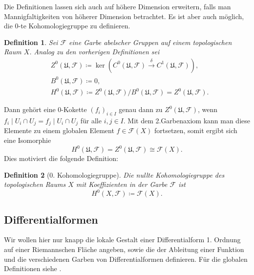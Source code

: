 \documentclass[11pt,a4paper,toc=bibliography]{scrartcl}
\theoremstyle{def}
\newtheorem{defi}{Definition}[section]
\theoremstyle{thm}
\theoremstyle{remark}
\newcommand*\dif{\mathop{}\!\mathrm{d}}\newcommand{\einschraenkung}{\,\rule[-5pt]{0.4pt}{12pt}\,{}} %
\begin{document}
Die Definitionen lassen sich auch auf höhere Dimension erweitern, falls man Mannigfaltigkeiten von höherer Dimension betrachtet. Es ist aber auch möglich, die 0-te Kohomologiegruppe zu definieren.


\begin{defi}
	Sei $\mathcal{F}$ eine Garbe abelscher Gruppen auf einem topologischen Raum $X$. Analog zu den vorherigen Definitionen sei
	\begin{align*}
		&Z^0(\mathfrak{U},\mathcal{F})\coloneqq \ker\left( C^0(\mathfrak{U},\mathcal{F}) \overset{\delta}{\rightarrow} C^1(\mathfrak{U},\mathcal{F})\right),\\
		&B^0(\mathfrak{U},\mathcal{F})\coloneqq 0,\\
		&H^0(\mathfrak{U},\mathcal{F})\coloneqq Z^0(\mathfrak{U},\mathcal{F})/B^0(\mathfrak{U},\mathcal{F})=Z^0(\mathfrak{U},\mathcal{F}).\end{align*}
	
\end{defi}
Dann gehört eine 0-Kokette $(f_i)_{i\in I}$ genau dann zu $Z^0(\mathfrak{U},\mathcal{F})$, wenn $f_i\mid U_i\cap U_j=f_j\mid U_i\cap U_j$ für alle $i,j\in I$. Mit dem 2.Garbenaxiom kann man diese Elemente zu einem globalen Element $f\in \mathcal{F}(X)$ fortsetzen, somit ergibt sich eine Isomorphie
\[ 
H^0(\mathfrak{U},\mathcal{F})=Z^0(\mathfrak{U},\mathcal{F})\cong \mathcal{F}(X).
\] 
Dies motiviert die folgende Definition:
\begin{defi}[0. Kohomologiegruppe]
	Die nullte Kohomologiegruppe des topologischen Raums $X$ mit Koeffizienten in der Garbe $\mathcal{F}$ ist
	\[H^0(X,\mathcal{F})\coloneqq \mathcal{F}(X).\]
\end{defi}


\subsection{Differentialformen}
Wir wollen hier nur knapp die lokale Gestalt einer Differentialform 1. Ordnung auf einer Riemannschen Fläche angeben, sowie die der Ableitung einer Funktion und die verschiedenen Garben von Differentialformen definieren. Für die globalen Definitionen siehe \cite[~Kap. 9,]{forster}. 
\nomenclature[Oa]{$\dif,\dif',\dif''$}{\nomrefpage}
\nomenclature[Gg]{$\Omega$}{\nomrefpage}
\end{document}
